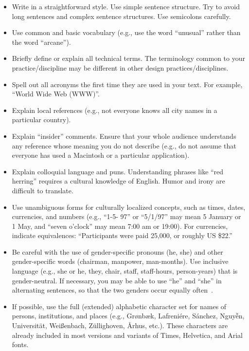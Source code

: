 \begin{itemize}\compresslist%
\item Write in a straightforward style. Use simple sentence
  structure. Try to avoid long sentences and complex sentence
  structures. Use semicolons carefully.
\item Use common and basic vocabulary (e.g., use the word ``unusual''
  rather than the word ``arcane'').
\item Briefly define or explain all technical terms. The terminology
  common to your practice/discipline may be different in other design
  practices/disciplines.
\item Spell out all acronyms the first time they are used in your
  text. For example, ``World Wide Web (WWW)''.
\item Explain local references (e.g., not everyone knows all city
  names in a particular country).
\item Explain ``insider'' comments. Ensure that your whole audience
  understands any reference whose meaning you do not describe (e.g.,
  do not assume that everyone has used a Macintosh or a particular
  application).
\item Explain colloquial language and puns. Understanding phrases like
  ``red herring'' requires a cultural knowledge of English. Humor and
  irony are difficult to translate.
\item Use unambiguous forms for culturally localized concepts, such as
  times, dates, currencies, and numbers (e.g., ``1-5- 97'' or
  ``5/1/97'' may mean 5 January or 1 May, and ``seven o'clock'' may
  mean 7:00 am or 19:00). For currencies, indicate equivalences:
  ``Participants were paid {\selectfont \textwon}
  25,000, or roughly US \$22.''
\item Be careful with the use of gender-specific pronouns (he, she)
  and other gender-specific words (chairman, manpower,
  man-months). Use inclusive language (e.g., she or he, they, chair,
  staff, staff-hours, person-years) that is gender-neutral. If
  necessary, you may be able to use ``he'' and ``she'' in alternating
  sentences, so that the two genders occur equally
  often~\cite{Schwartz:1995:GBF}.
\item If possible, use the full (extended) alphabetic character set
  for names of persons, institutions, and places (e.g.,
  Gr{\o}nb{\ae}k, Lafreni\'ere, S\'anchez, Nguy{\~{\^{e}}}n,
  Universit{\"a}t, Wei{\ss}enbach, Z{\"u}llighoven, \r{A}rhus, etc.).
  These characters are already included in most versions and variants
  of Times, Helvetica, and Arial fonts.
\end{itemize}

